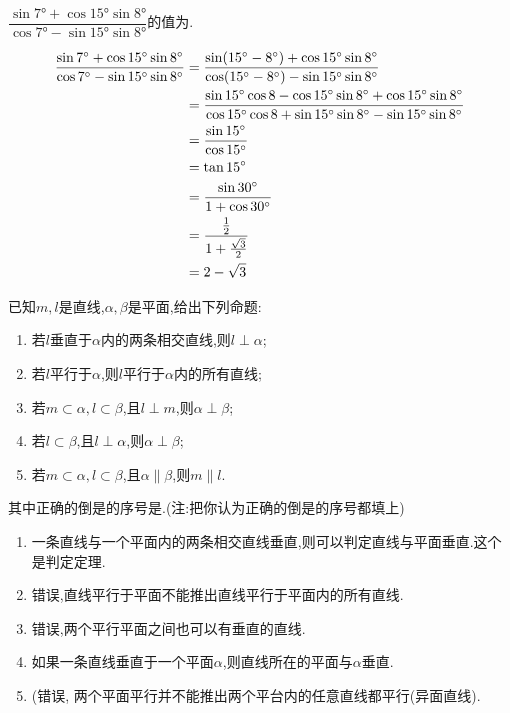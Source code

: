 \documentclass[answers]{exam}
\begin{document}
\begin{questions}
	\question
	$\dfrac{\sin{\ang{7}}+\cos{\ang{15}}\sin{\ang{8}}}{\cos{\ang{7}}-\sin{\ang{15}}\sin{\ang{8}}}$的值为\fillin[$2-\sqrt{3}$][2cm].

	\begin{solution}
		\begin{align*}
			\frac{\sin{\ang{7}}+\cos{\ang{15}}\sin{\ang{8}}}{\cos{\ang{7}}-\sin{\ang{15}}\sin{\ang{8}}}
			 & = \frac{\sin(\ang{15}-\ang{8}) + \cos\ang{15}\sin\ang8}{\cos(\ang{15}-\ang8) -\sin\ang{15}\sin\ang8} \\
			 & = \frac{\sin\ang{15}\cos8 - \cos\ang{15}\sin\ang8 + \cos\ang{15}\sin\ang8}
			{\cos\ang{15}\cos8 + \sin\ang{15}\sin\ang8 - \sin\ang{15}\sin\ang8}                                     \\
			 & = \frac{\sin\ang{15}}{\cos\ang{15}}                                                                  \\
			 & = \tan\ang{15}                                                                                       \\
			 & = \frac{\sin\ang{30}}{1+\cos\ang{30}}                                                                \\
			 & = \frac{\frac12}{1+\frac{\sqrt{3}}{2}}                                                               \\
			 & = 2 - \sqrt{3}
		\end{align*}
	\end{solution}

	\question 已知$m,l$是直线,$\alpha,\beta$是平面,给出下列命题:
	\begin{enumerate}[label=\protect\circled{\arabic*}]
		\item 若$l$垂直于$\alpha$内的两条相交直线,则$l\perp \alpha$;
		\item 若$l$平行于$\alpha$,则$l$平行于$\alpha$内的所有直线;
		\item 若$m\subset\alpha, l\subset\beta$,且$l\perp m$,则$\alpha\perp\beta$;
		\item 若$l\subset\beta$,且$l\perp\alpha$,则$\alpha\perp\beta$;
		\item 若$m\subset\alpha,l\subset\beta$,且$\alpha\parallel\beta$,则$m\parallel l$.
	\end{enumerate}
	其中正确的倒是的序号是.(注:把你认为正确的倒是的序号都填上)

	\begin{solution}
		\begin{enumerate}[label=\protect\circled{\arabic*}]
			\item 一条直线与一个平面内的两条相交直线垂直,则可以判定直线与平面垂直.这个是判定定理.
			\item 错误,直线平行于平面不能推出直线平行于平面内的所有直线.
			\item 错误,两个平行平面之间也可以有垂直的直线.
			\item 如果一条直线垂直于一个平面$\alpha$,则直线所在的平面与$\alpha$垂直.
			\item (错误, 两个平面平行并不能推出两个平台内的任意直线都平行(异面直线).
		\end{enumerate}
	\end{solution}


\end{questions}
\end{document}
